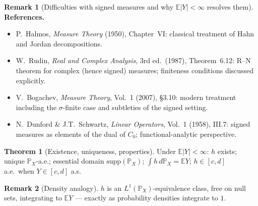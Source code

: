 \documentclass[12pt, a4paper]{article}
\theoremstyle{definition}
\newtheorem{theorem}{Theorem}[section]
\newtheorem{remark}{Remark}[section]
\newcommand{\E}{\mathbb{E}}
\newcommand{\R}{\mathbb{R}}
\newcommand{\Prob}{\mathbb{P}}
\begin{document}
\begin{remark}[Difficulties with signed measures and why $\E|Y|<\infty$
  resolves them]
\medskip
\textbf{References.}
\begin{itemize}[itemsep=2pt]
  \item P.~Halmos, \textit{Measure Theory} (1950), Chapter~VI:
    classical treatment of Hahn and Jordan decompositions.
  \item W.~Rudin, \textit{Real and Complex Analysis}, 3rd ed.\
    (1987), Theorem~6.12: R--N theorem for complex (hence signed)
    measures; finiteness conditions discussed explicitly.
  \item V.~Bogachev, \textit{Measure Theory}, Vol.~1 (2007),
    \S3.10: modern treatment including the $\sigma$-finite case
    and subtleties of the signed setting.
  \item N.~Dunford \& J.T.~Schwartz,
    \textit{Linear Operators}, Vol.~1 (1958), III.7:
    signed measures as elements of the dual of $C_0$;
    functional-analytic perspective.
\end{itemize}
\end{remark}

\begin{theorem}[Existence, uniqueness, properties]\label{thm:RNexist}
Under $\E|Y|<\infty$: $h$ exists; unique $\Prob_X$-a.e.; essential
domain $\mathrm{supp}(\Prob_X)$; $\int h\,d\Prob_X=\E Y$;
$h\in[c,d]$ a.e.\ when $Y\in[c,d]$ a.s.
\end{theorem}

\begin{remark}[Density analogy]
$h$ is an $L^1(\Prob_X)$-equivalence class, free on null sets,
integrating to $\E Y$ --- exactly as probability densities
integrate to $1$.
\end{remark}

\medskip
\begin{center}
\end{center}
\medskip
\end{document}
